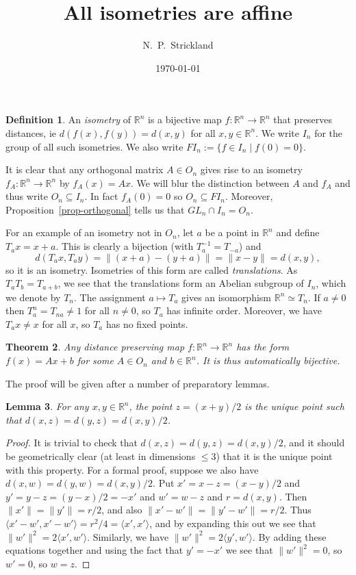 \documentclass{amsart}
\newcommand{\R}         {{\mathbb{R}}}
\newcommand{\ip}[1]     {\langle #1\rangle}
\newcommand{\sse}       {\subseteq}
\newcommand{\st}        {\;|\;}
\newcommand{\xra}       {\xrightarrow}
\renewcommand{\:}       {\colon}
\newtheorem{theorem}{Theorem}
\newtheorem{lemma}[theorem]{Lemma}
\theoremstyle{definition}
\newtheorem{definition}[theorem]{Definition}
\begin{document}
\title{All isometries are affine}
\author{N.~P.~Strickland}
\date{\today}


\maketitle

\begin{definition}
 An \emph{isometry} of $\R^n$ is a bijective map $f\:\R^n\xra{}\R^n$
 that preserves distances, ie $d(f(x),f(y))=d(x,y)$ for all
 $x,y\in\R^n$.  We write $I_n$ for the group of all such isometries.
 We also write $FI_n:=\{f\in I_n\st f(0)=0\}$.
\end{definition}

It is clear that any orthogonal matrix $A\in O_n$ gives rise to an
isometry $f_A\:\R^n\xra{}\R^n$ by $f_A(x)=Ax$.  We will blur the
distinction between $A$ and $f_A$ and thus write $O_n\sse I_n$.  In
fact $f_A(0)=0$ so $O_n\sse FI_n$.  Moreover,
Proposition~\ref{prop-orthogonal} tells us that
$GL_n\cap I_n=O_n$.

For an example of an isometry not in $O_n$, let $a$ be a point in
$\R^n$ and define $T_ax=x+a$.  This is clearly a bijection (with
$T_a^{-1}=T_{-a}$) and
\[ d(T_ax,T_ay)=\|(x+a)-(y+a)\|=\|x-y\|=d(x,y), \]
so it is an isometry.  Isometries of this form are called
\emph{translations}.  As $T_aT_b=T_{a+b}$, we see that the
translations form an Abelian subgroup of $I_n$, which we denote by
$T_n$.  The assignment $a\mapsto T_a$ gives an isomorphism $\R^n\simeq
T_n$.  If $a\neq 0$ then $T_a^n=T_{na}\neq 1$ for all $n\neq 0$, so
$T_a$ has infinite order.  Moreover, we have $T_ax\neq x$ for all $x$,
so $T_a$ has no fixed points.

\begin{theorem}\label{thm-isometry}
 Any distance preserving map $f\:\R^n\xra{}\R^n$ has the form
 $f(x)=Ax+b$ for some $A\in O_n$ and $b\in\R^n$.  It is thus
 automatically bijective.
\end{theorem}
The proof will be given after a number of preparatory lemmas.

\begin{lemma}
 For any $x,y\in\R^n$, the point $z=(x+y)/2$ is the unique point such
 that $d(x,z)=d(y,z)=d(x,y)/2$.
\end{lemma}
\begin{proof}
 It is trivial to check that $d(x,z)=d(y,z)=d(x,y)/2$, and it should
 be geometrically clear (at least in dimensions $\leq 3$) that it is
 the unique point with this property.  For a formal proof, suppose we
 also have $d(x,w)=d(y,w)=d(x,y)/2$.  Put $x'=x-z=(x-y)/2$ and
 $y'=y-z=(y-x)/2=-x'$ and $w'=w-z$ and $r=d(x,y)$.  Then
 $\|x'\|=\|y'\|=r/2$, and also $\|x'-w'\|=\|y'-w'\|=r/2$.  Thus
 $\ip{x'-w',x'-w'}=r^2/4=\ip{x',x'}$, and by expanding this out we
 see that $\|w'\|^2=2\ip{x',w'}$.  Similarly, we have
 $\|w'\|^2=2\ip{y',w'}$.  By adding these equations together and
 using the fact that $y'=-x'$ we see that $\|w'\|^2=0$, so $w'=0$, so
 $w=z$.
\end{proof}
\end{document}
